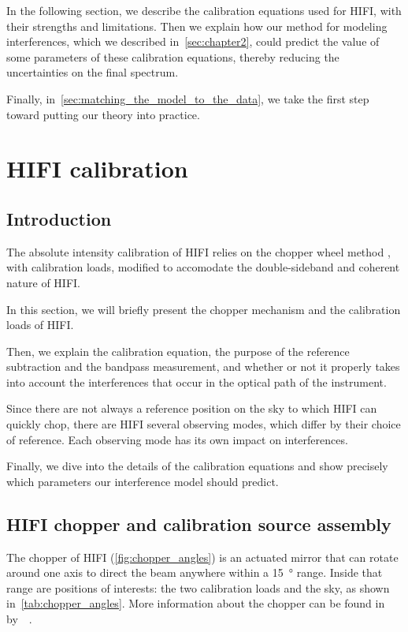 In the following section, we describe the calibration equations used for HIFI, with their strengths and limitations.
Then we explain how our method for modeling interferences, which we described in~\cref{sec:chapter2}, could predict the value of some parameters of these calibration equations, thereby reducing the uncertainties on the final spectrum.

Finally, in~\cref{sec:matching_the_model_to_the_data}, we take the first step toward putting our theory into practice.


\section{HIFI calibration}
\label{seq:hifi_calibration}

\subsection{Introduction}
The absolute intensity calibration of HIFI relies on the chopper wheel method \cite{ulich1976absolute}, with calibration loads, modified to accomodate the double-sideband and coherent nature of HIFI.

In this section, we will briefly present the chopper mechanism and the calibration loads of HIFI.

Then, we explain the calibration equation, the purpose of the reference subtraction and the bandpass measurement, and whether or not it properly takes into account the interferences that occur in the optical path of the instrument.

Since there are not always a reference position on the sky to which HIFI can quickly chop, 
there are HIFI several observing modes, which differ by their choice of reference.
Each observing mode has its own impact on interferences.

Finally, we dive into the details of the calibration equations and show precisely which parameters our interference model should predict.

\subsection{HIFI chopper and calibration source assembly}

The chopper of HIFI (\cref{fig:chopper_angles}) is an actuated mirror that can rotate around one axis to direct the beam anywhere within a \SI{15}{\degree} range.
Inside that range are positions of interests: the two calibration loads and the sky, as shown in~\cref{tab:chopper_angles}.
More information about the chopper can be found in~
by~\citeauthor{huisman2011cryogenic}~\cite{huisman2011cryogenic}.

